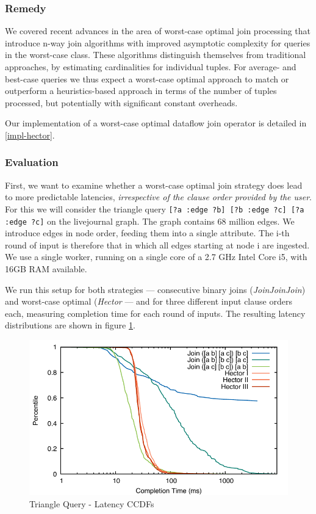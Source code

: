 \documentclass[../catalog.tex]{subfiles}
\begin{document}
\subsubsection{Remedy}

We covered recent advances in the area of worst-case optimal join
processing that introduce n-way join algorithms with improved
asymptotic complexity for queries in the worst-case class. These
algorithms distinguish themselves from traditional approaches, by
estimating cardinalities for individual tuples. For average- and
best-case queries we thus expect a worst-case optimal approach to
match or outperform a heuristics-based approach in terms of the number
of tuples processed, but potentially with significant constant
overheads.

Our implementation of a worst-case optimal dataflow join operator is
detailed in \autoref{impl-hector}.

\subsubsection{Evaluation}

First, we want to examine whether a worst-case optimal join strategy
does lead to more predictable latencies, \emph{irrespective of the
  clause order provided by the user}. For this we will consider the
triangle query \texttt{[?a :edge ?b] [?b :edge ?c] [?a :edge ?c]} on
the livejournal graph. The graph contains 68 million edges. We
introduce edges in node order, feeding them into a single
attribute. The i-th round of input is therefore that in which all
edges starting at node i are ingested. We use a single worker, running
on a single core of a 2.7 GHz Intel Core i5, with 16GB RAM available.

We run this setup for both strategies — consecutive binary joins
(\emph{JoinJoinJoin}) and worst-case optimal (\emph{Hector} — and for
three different input clause orders each, measuring completion time
for each round of inputs. The resulting latency distributions are
shown in figure \ref{fig:triangle-cdfs}.

\begin{figure}[h!]
  \includegraphics[width=1.0\linewidth]{results/triangles/out/all_cdfs}
  \caption{Triangle Query - Latency CCDFs}
  \label{fig:triangle-cdfs}
\end{figure}
\end{document}

